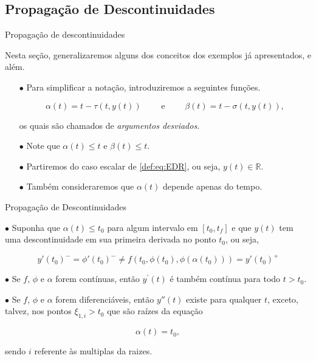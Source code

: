 \documentclass{beamer}
\newcommand{\R}{\mathbb{R}}
\theoremstyle{plain}
\theoremstyle{definition}
\begin{document}
\subsection{Propagação de Descontinuidades}
\begin{frame}{Propagação de descontinuidades}

    Nesta seção, generalizaremos alguns dos conceitos dos exemplos já apresentados, e além.

    \begin{itemize}

        \item[$\bullet$] Para simplificar a notação, introduziremos a seguintes funções.

            \[
                \alpha(t)=t-\tau(t, y(t)) \qquad \text{ e } \qquad \beta(t)=t-\sigma(t, y(t)),
            \]

        \noindent
        os quais são chamados de \textit{argumentos desviados}. 

        \item[$\bullet$] Note que $\alpha(t) \leq t$ e $\beta(t) \leq t$.

        \item[$\bullet$] Partiremos do caso escalar de \eqref{def:eq:EDR}, ou seja, $y(t) \in \R$.

        \item[$\bullet$] Também consideraremos que $\alpha(t)$ depende apenas do tempo.

    \end{itemize}
         

\end{frame}



\begin{frame}{Propagação de Descontinuidades}
    


    $\bullet$ Suponha que $\alpha(t) \leq t_0$ para algum intervalo em $[t_0, t_f]$ e que $y(t)$ tem uma descontinuidade em sua primeira derivada no ponto $t_0$, ou seja, 

    \[
        y'(t_0)^- = \phi'(t_0)^- \neq f(t_0, \phi(t_0), \phi(\alpha(t_0))) = y'(t_0)^+
    \]

    $\bullet$ Se \(f\), \(\phi\) e \(\alpha\) forem contínuas, então  \(y^{\prime}(t)\) é também contínua para todo \(t>t_{0}\). 
    
    $\bullet$ Se \(f\), \(\phi\) e \(\alpha\) forem diferenciáveis, então \(y''(t)\) existe para qualquer \(t\), exceto, talvez, nos pontos \(\xi_{1, i} >t_{0}\) que são raízes da equação


    \[
        \alpha(t)=t_{0},
    \]

    sendo $i$ referente às multiplas da raizes.

\end{frame}
\end{document}
